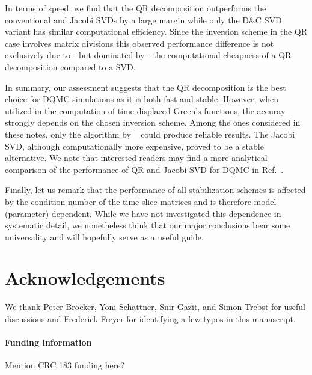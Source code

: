 \documentclass[submission, Phys]{SciPost}
\begin{document}
In terms of speed, we find that the QR decomposition outperforms the conventional and Jacobi SVDs by a large margin while only the D\&C SVD variant has similar computational efficiency. Since the inversion scheme in the QR case involves matrix divisions this observed performance difference is not exclusively due to - but dominated by - the computational cheapness of a QR decomposition compared to a SVD.

In summary, our assessment suggests that the QR decomposition is the best choice for DQMC simulations as it is both fast and stable. However, when utilized in the computation of time-displaced Green's functions, the accuray strongly depends on the chosen inversion scheme. Among the ones considered in these notes, only the algorithm by  ~\cite{Loh1989} could produce reliable results. The Jacobi SVD, although computationally more expensive, proved to be a stable alternative. We note that interested readers may find a more analytical comparison of the performance of QR and Jacobi SVD for DQMC in Ref.~\cite{Bai2011}.

Finally, let us remark that the performance of all stabilization schemes is affected by the condition number of the time slice matrices and is therefore model (parameter) dependent. While we have not investigated this dependence in systematic detail,  we nonetheless think that our major conclusions bear some universality and will hopefully serve as a useful guide.



\section*{Acknowledgements}
We thank Peter Bröcker, Yoni Schattner, Snir Gazit, and Simon Trebst for useful discussions and Frederick Freyer for identifying a few typos in this manuscript.

\paragraph{Funding information}
Mention CRC 183 funding here?
\end{document}
